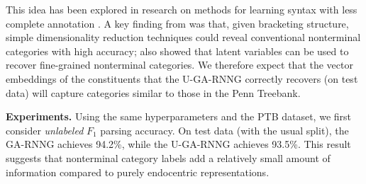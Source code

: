 \documentclass[11pt]{article}
\newcommand{\ask}[1]{\textcolor{orange}{{\textbf{[#1 --\textsc{ask}]}}}}
\newcommand{\nascomment}[1]{\textcolor{blue}{{\textbf{[#1 --\textsc{nas}]}}}}
\renewcommand{\ask}[1]{}
\renewcommand{\nascomment}[1]{}
\begin{document}
This idea has been explored in research on methods for learning syntax with less complete annotation \cite{pereira-92}.   A key finding from  was that, given bracketing structure, simple dimensionality reduction techniques could reveal conventional nonterminal categories with high accuracy;  also showed that latent variables can be used to recover fine-grained nonterminal categories.  We therefore expect that the vector embeddings of the constituents that the U-GA-RNNG correctly recovers (on test data) will capture categories similar to those in the Penn Treebank. 

\textbf{Experiments.} Using the same hyperparameters and the PTB dataset, we first consider \emph{unlabeled} $F_1$ parsing accuracy.  On test data (with the usual split), the GA-RNNG achieves 94.2\%, while the U-GA-RNNG achieves 93.5\%. This result suggests that nonterminal category labels add a relatively small amount of information compared to purely endocentric representations.



\end{document}
